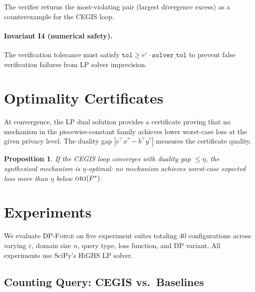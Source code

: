 \documentclass[11pt,a4paper]{article}
\newtheorem{proposition}[theorem]{Proposition}
\begin{document}
The verifier returns the most-violating pair (largest divergence excess)
as a counterexample for the CEGIS loop.

\paragraph{Invariant I4 (numerical safety).}
The verification tolerance must satisfy
$\texttt{tol} \ge e^\varepsilon \cdot \texttt{solver\_tol}$
to prevent false verification failures from LP solver imprecision.

\section{Optimality Certificates}
\label{sec:certificates}

At convergence, the LP dual solution provides a certificate proving that no
mechanism in the piecewise-constant family achieves lower worst-case loss at
the given privacy level.  The duality gap $|c^\top x^* - b^\top y^*|$
measures the certificate quality.

\begin{proposition}
If the CEGIS loop converges with duality gap $\le \eta$, the synthesized
mechanism is $\eta$-optimal: no mechanism achieves worst-case expected loss
more than $\eta$ below $\textsc{obj}(P^*)$.
\end{proposition}

\section{Experiments}
\label{sec:experiments}

We evaluate \textsc{DP-Forge} on five experiment suites totaling 40
configurations across varying $\varepsilon$, domain size $n$, query type,
loss function, and DP variant.  All experiments use SciPy's HiGHS LP solver.


\subsection{Counting Query: CEGIS vs.\ Baselines}
\end{document}
